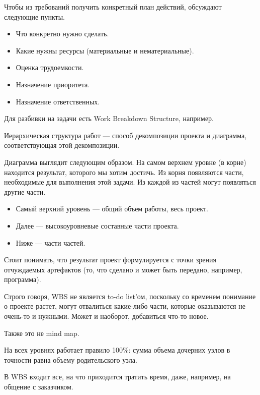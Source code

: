     \begin{Rem}
        Чтобы из требований получить конкретный план действий, обсуждают следующие пункты.
        \begin{itemize}
            \item Что конкретно нужно сделать.
            \item Какие нужны ресурсы (материальные и нематериальные).
            \item Оценка трудоемкости.
            \item Назначение приоритета.
            \item Назначение ответственных.
        \end{itemize}

        Для разбивки на задачи есть Work Breakdown Structure, например.
    \end{Rem}


    \begin{Def}
        Иерархическая структура работ --- способ декомпозиции проекта и диаграмма, соответствующая этой декомпозиции.

        Диаграмма выглядит следующим образом. На самом верхнем уровне (в корне) находится результат, которого мы хотим достичь. Из корня появляются части, необходимые для выполнения этой задачи. Из каждой из частей могут появляться другие части.

        \begin{itemize}
            \item Самый верхний уровень --- общий объем работы, весь проект.
            \item Далее --- высокоуровневые составные части проекта.
            \item Ниже --- части частей.
        \end{itemize}
    \end{Def}

    \begin{Rem}
        Стоит понимать, что результат проект формулируется с точки зрения отчуждаемых артефактов (то, что сделано и может быть передано, например, программа).

        Строго говоря, WBS не является to-do list'ом, поскольку со временем понимание о проекте растет, могут отвалиться какие-либо части, которые оказываются не очень-то и нужными. Может и наоборот, добавиться что-то новое.

        Также это не mind map.

        На всех уровнях работает правило 100\%: сумма объема дочерних узлов в точности равна объему родительского узла.

        В WBS входит все, на что приходится тратить время, даже, например, на общение с заказчиком.
    \end{Rem}

